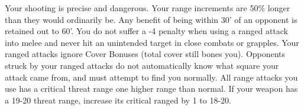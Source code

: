 \combatfeat
{Your shooting is precise and dangerous.}
{Your range increments are 50\% longer than they would ordinarily be. Any benefit of being within 30' of an opponent is retained out to 60'.}
{You do not suffer a -4 penalty when using a ranged attack into melee and never hit an unintended target in close combats or grapples.}
{Your ranged attacks ignore Cover Bonuses (total cover still bones you).}
{Opponents struck by your ranged attacks do not automatically know what square your attack came from, and must attempt to find you normally.}
{All range attacks you use has a critical threat range one higher range than normal. If your weapon has a 19-20 threat range, increase its critical ranged by 1 to 18-20.}